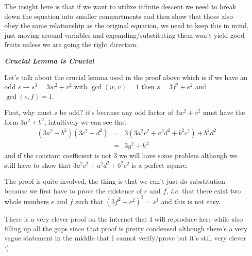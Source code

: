 \documentclass[aps,preprint,preprintnumbers,nofootinbib,showpacs,prd]{revtex4-1}
\newcommand{\ie}{{\it i.e.} }
\newcommand{\nbea}{\begin{eqnarray*}}
\newcommand{\neea}{\end{eqnarray*}}
\begin{document}
The insight here is that if we want to utilize infinite descent we need to break down the equation into smaller compartments and then show that those also obey the same relationship as the original equation, we need to keep this in mind, just moving around variables and expanding/substituting them won't yield good fruits unless we are going the right direction.

\bigskip
\textit{\textbf{Crucial Lemma is Crucial}}
\smallskip

Let's talk about the crucial lemma used in the proof above which is if we have an odd $s \to s^3 = 3w^2 + v^2$ with $\gcd(w,v)=1$ then $s = 3f^2 + e^2$ and $\gcd(e,f)=1$.

First, why must $s$ be odd? it's because any odd factor of $3w^2 + v^2$ must have the form $3a^2 + b^2$, intuitively we can see that
%
\nbea
(3a^2 + b^2)(3c^2+d^2) & = & 3(3a^2c^2 + a^2d^2 + b^2c^2) + b^2d^2 \\
& = & 3g^2 + h^2
\neea
%
and if the constant coefficient is not 3 we will have some problem although we still have to show that $3a^2c^2 + a^2d^2 + b^2c^2$ is a perfect square.

The proof is quite involved, the thing is that we can't just do substitution because we first have to prove the existence of $e$ and $f$, \ie that there exist two whole numbers $e$ and $f$ such that $(3f^2 + e^2)^3 = s^3$ and this is not easy.

There is a very clever proof on the internet that I will reproduce here while also filling up all the gaps since that proof is pretty condensed although there's a very vague statement in the middle that I cannot verify/prove but it's still very clever :)
\end{document}
